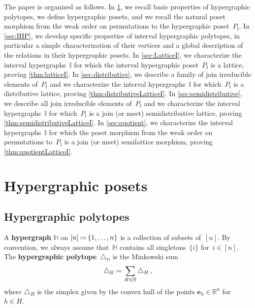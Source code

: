 \documentclass{amsart}
\theoremstyle{definition}
\newcommand{\R}{\mathbb{R}} %
\renewcommand{\b}[1]{\boldsymbol{#1}} %
\newcommand{\eqdef}{\mbox{\,\raisebox{0.2ex}{\scriptsize\ensuremath{\mathrm:}}\ensuremath{=}\,}} %
\newcommand{\simplex}{\triangle} %
\newcommand{\defn}[1]{\textbf{\textsf{\color{PineGreen} #1}}} %
\newcommand{\HH}{\mathbb H}  %
\newcommand{\II}{\mathbb I} %
\begin{document}
The paper is organized as follows.
In \cref{sec:HP}, we recall basic properties of hypergraphic polytopes, we define hypergraphic posets, and we recall the natural poset morphism from the weak order on permutations to the hypergraphic poset~$P_\II$.
In \cref{sec:IHP}, we develop specific properties of interval hypergraphic polytopes, in particular a simple characterization of their vertices and a global description of the relations in their hypergraphic posets.
In \cref{sec:LatticeI}, we characterize the interval hypergraphs~$\II$ for which the interval hypergraphic poset~$P_\II$ is a lattice, proving \cref{thm:latticeI}.
In \cref{sec:distributive}, we describe a family of join irreducible elements of~$P_\II$ and we characterize the interval hypergraphs~$\II$ for which~$P_\II$ is a distributive lattice, proving \cref{thm:distributiveLatticeI}.
In \cref{sec:semidistributive}, we describe all join irreducible elements of~$P_\II$ and we characterize the interval hypergraphs~$\II$ for which~$P_\II$ is a join (or meet) semidistributive lattice, proving \cref{thm:semidistributiveLatticeI}.
In \cref{sec:quotient}, we characterize the interval hypergraphs~$\II$ for which the poset morphism from the weak order on permutations to~$P_\II$ is a join (or meet) semilattice morphism, proving \cref{thm:quotientLatticeI}.


\setcounter{theoremA}{0}


\section{Hypergraphic posets}
\label{sec:HP}


\subsection{Hypergraphic polytopes}
\label{subsec:D_H}

A \defn{hypergraph} $\HH$ on $[n] \eqdef \{1, \dots, n\}$ is a collection of  subsets of~$[n]$.
By convention, we always assume that~$\HH$ contains all singletons~$\{i\}$ for~$i\in [n]$.
The \defn{hypergraphic polytope}~$\simplex_\HH$ is the Minkowski sum
\[
\simplex_\HH \eqdef \sum_{H\in \HH} \simplex_H\,,
\]
where $\simplex_H$ is the simplex given by the convex hull of the points $\b{e}_h \in \R^n$ for~$h \in H$.
\end{document}

